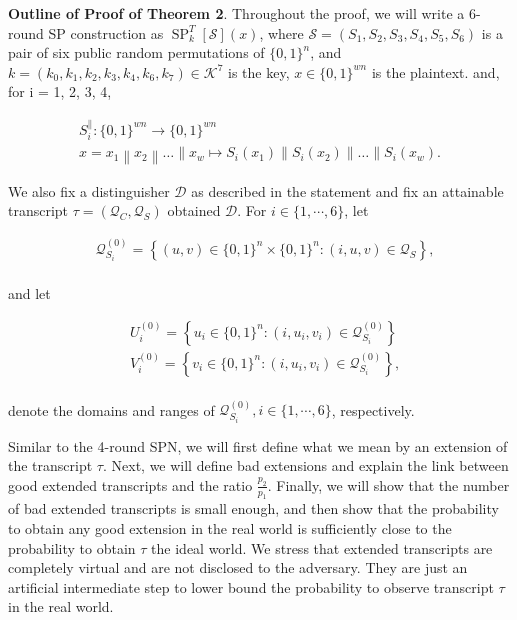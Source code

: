 \noindent \textbf{Outline of Proof of Theorem 2}. Throughout the proof, we will write a 6-round SP construction as $\operatorname{SP}^T_{k}[\mathcal{S}](x)$, where $\mathcal{S}=(S_1, S_2, S_3, S_4, S_5, S_6)$  is a pair of six public random permutations of $\{0,1\}^{n}$, and $k = (k_{0}, k_{1}, k_{2}, k_{3}, k_{4}, k_{6}, k_{7}) \in \mathcal{K}^{7}$ is the key, $x \in \{0,1\}^{w n}$ is the plaintext. and, for i = 1, 2, 3, 4,

$$
\begin{array}{c}
{S_{i}^{\|}:\{0,1\}^{w n} \rightarrow\{0,1\}^{w n}} \\
{x=x_{1}\left\|x_{2}\right\| \ldots\left\|x_{w} \longmapsto S_{i}\left(x_{1}\right)\right\| S_{i}\left(x_{2}\right)\|\ldots\| S_{i}\left(x_{w}\right)}.
\end{array}
$$

We also fix a distinguisher $\mathcal{D}$ as described in the statement and fix an attainable transcript $\tau =\left(\mathcal{Q}_{C}, \mathcal{Q}_{S}\right)$ obtained $\mathcal{D}$. For $i \in \{1, \cdots, 6\}$, let

$$
\begin{aligned}
&\mathcal{Q}_{S_{i}}^{(0)}=\left\{(u, v) \in\{0,1\}^{n} \times\{0,1\}^{n}:(i, u, v) \in \mathcal{Q}_{S} \right\},\\
\end{aligned}
$$

\noindent and let

$$
\begin{aligned}
&U_{i}^{(0)}=\left\{u_{i} \in\{0,1\}^{n}:\left(i, u_{i}, v_{i}\right) \in \mathcal{Q}_{S_{i}}^{(0)}\right\}\\
&V_{i}^{(0)}=\left\{v_{i} \in\{0,1\}^{n}:\left(i, u_{i}, v_{i}\right) \in \mathcal{Q}_{S_{i}}^{(0)}\right\},\\
\end{aligned}
$$

\noindent denote the domains and ranges of $\mathcal{Q}_{S_{i}}^{(0)}, i \in \{1, \cdots, 6\}$, respectively.

Similar to the 4-round SPN, we will first define what we mean by an extension of the transcript $\tau$. Next, we will define bad extensions and explain the link between good extended transcripts and the ratio $\frac{p_2}{p_1}$. Finally, we will show that the number of bad extended transcripts is small enough, and then show that the probability to obtain any good extension in the real world is sufficiently close to the probability to obtain $\tau$ the ideal world. We stress that extended transcripts are completely virtual and are not disclosed to the adversary. They are just an artificial intermediate step to lower bound the probability to observe transcript $\tau$ in the real world.\\

